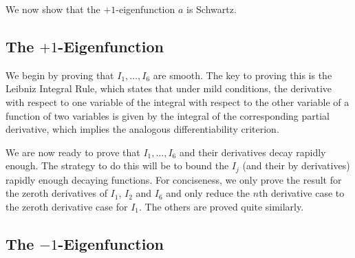 We now show that the $+1$-eigenfunction $a$ is Schwartz.

\subsection{The $+1$-Eigenfunction}

We begin by proving that $I_1, \ldots, I_6$ are smooth. The key to proving this is the Leibniz Integral Rule, which states that under mild conditions, the derivative with respect to one variable of the integral with respect to the other variable of a function of two variables is given by the integral of the corresponding partial derivative, which implies the analogous differentiability criterion.


We are now ready to prove that $I_1, \ldots, I_6$ and their derivatives decay rapidly enough. The strategy to do this will be to bound the $I_j$ (and their by derivatives) rapidly enough decaying functions. For conciseness, we only prove the result for the zeroth derivatives of $I_1$, $I_2$ and $I_6$ and only reduce the $n$th derivative case to the zeroth derivative case for $I_1$. The others are proved quite similarly.


\subsection{The $-1$-Eigenfunction}